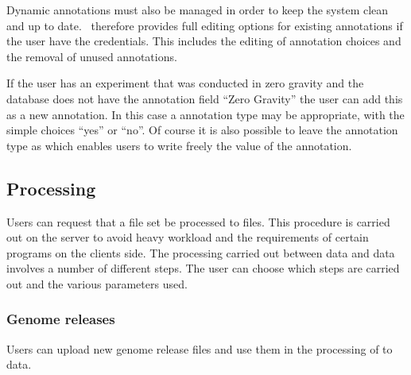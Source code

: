 Dynamic annotations must also be managed in order to keep the system clean and up to date. \appName\ therefore provides full editing options for existing annotations if the user have the credentials. This includes the editing of  annotation choices and the removal of unused annotations.

\begin{example}
If the user has an experiment that was conducted in zero gravity and the database does not have the annotation field ``Zero Gravity'' the user can add this as a new annotation. In this case a  annotation type may be appropriate, with the simple choices ``yes'' or ``no''. Of course it is also possible to leave the annotation type as  which enables users to write  freely the value of the annotation.
\end{example}

\subsection{Processing}
Users can request that a  file set be processed to  files. This procedure is carried out on the server to avoid heavy workload and the requirements of certain programs on the clients side. The processing carried out between  data and  data involves a number of different steps. The user can choose which steps are carried out and the various parameters used.

\subsubsection{Genome releases}
Users can upload new genome release files and use them in the processing of  to  data.





